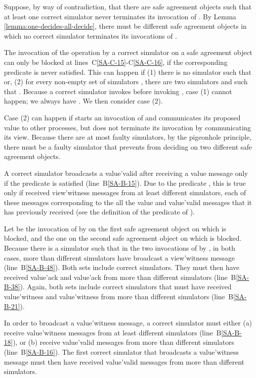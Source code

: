 \documentclass[11pt,letterpaper]{article}
\newlength {\afterproof}
\newenvironment{proofL}{\noindent{\bf Proof }}
{\hspace*{\fill}\par\vspace{\afterproof}}
\begin{document}
\begin{proofL}
Suppose, by way of contradiction, that there are  safe agreement 
objects such that at least one correct simulator never terminates its 
invocation of . By Lemma 
\ref{lemma:one-decides-all-decide}, there must be 
  different safe agreement objects in which 
no correct simulator  terminates its invocations of .



The invocation of the  operation by a correct simulator 
 on a safe agreement object can only be blocked at 
lines~C\ref{SA-C-15}-C\ref{SA-C-16}, if the corresponding predicate is 
never satisfied. This can happen if (1) there is no simulator  such 
that  or, (2) for every non-empty set of 
simulators , there are  two  simulators  and   
such that .
Because a correct simulator  invokes    
before invoking , case (1) cannot happen; we always have 
. We then consider case (2). 

Case (2) can happen if  starts an invocation of 
 and communicates its proposed value to other processes, 
but does not terminate its invocation by communicating its view.
Because there are at most  faulty simulators, by the pigeonhole 
principle, there must be a faulty simulator  that prevents  from 
deciding on two different safe agreement objects.

A correct simulator  broadcasts a {\sc value'valid}
after receiving a {\sc value} message only if the predicate 
 is satisfied (line~B\ref{SA-B-15}). 
Due to the predicate , this is true only if  received 
{\sc view'witness} messages from at least  different 
simulators, each of these messages corresponding to the all the  
{\sc value} and {\sc value'valid} messages 
that it has previously received (see the definition of the predicate  of 
). 

Let  be the invocation of  by  on 
the first safe agreement object on which  is blocked, and 
 the one on the second safe agreement object on which 
 is blocked. Because there is a simulator  such that 
 in the two invocations of  by 
, in both cases, more than  different simulators
have broadcast a {\sc view'witness} message (line~B\ref{SA-B-48}). 
Both sets  include correct simulators. They 
must then have received {\sc value'ack} and 
{\sc value'ack} from more than  different 
simulators (line~B\ref{SA-B-38}). Again, both sets  include correct 
simulators that must have received {\sc value'witness} and 
{\sc value'witness} from more than  different 
simulators (line~B\ref{SA-B-21}).

In order to broadcast a {\sc value'witness} message,
a correct simulator must either (a) receive {\sc value'witness} 
messages from at least  different simulators (line~B\ref{SA-B-18}),
or (b) receive {\sc value'valid} messages from more than  
different simulators (line~B\ref{SA-B-16}). The first correct simulator 
that broadcasts a 
{\sc value'witness} message must then have received 
{\sc value'valid} messages from more than  
different simulators.


\end{proofL}
\end{document}
